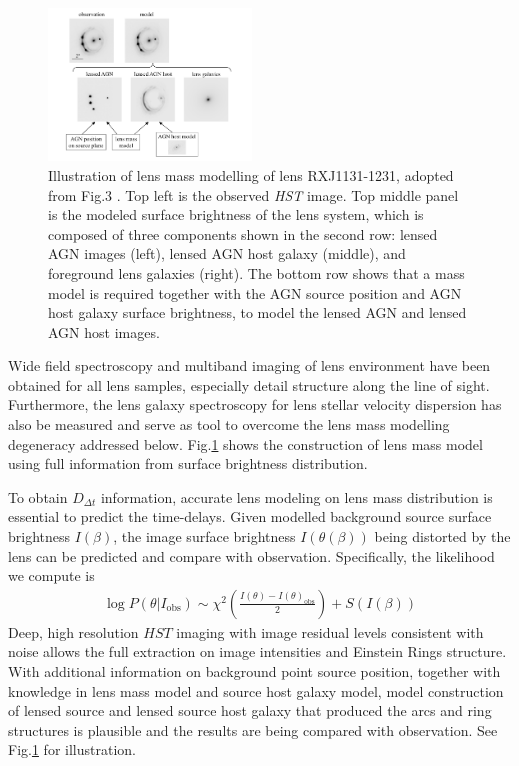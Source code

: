 \documentclass{cosmo}
\begin{document}
    \begin{figure}[h]
        \centering
        \includegraphics[width=0.48\textwidth]{fig3_2.png}
        \caption{Illustration of lens mass modelling of lens RXJ1131-1231, adopted from Fig.3  \cite{Suyu2018}. Top left is the observed \textit{HST} image. Top middle panel is the modeled surface brightness of the lens system, which is composed of three components shown in the second row: lensed AGN images (left), lensed AGN host galaxy (middle), and foreground lens galaxies (right). The bottom row shows that a mass model is required together with the AGN source position and AGN host galaxy surface brightness, to model the lensed AGN and lensed AGN host images.}
        \label{fig3}
    \end{figure}
    
    Wide field spectroscopy and multiband imaging of lens environment have been obtained for all lens samples, especially detail structure along the line of sight. Furthermore, the lens galaxy spectroscopy for lens stellar velocity dispersion has also be measured and serve as tool to overcome the lens mass modelling degeneracy addressed below. Fig.\ref{fig3} shows the construction of lens mass model using full information from surface brightness distribution.
    
    To obtain $D_{\Delta t}$ information, accurate lens modeling on lens mass distribution is essential to predict the time-delays. Given modelled background source surface brightness $I(\beta)$, the image surface brightness $I(\theta(\beta))$ being distorted by the lens can be predicted and compare with observation. Specifically, the likelihood we compute is 
    \begin{align*}
        \log P(\theta|I_\mathrm{obs}) \sim \chi^2 \left( \frac{I(\theta)-I(\theta)_{\mathrm{obs}}}{2}\right) + S(I(\beta)) 
    \end{align*}
    Deep, high resolution $\textit{HST}$ imaging with image residual levels consistent with noise allows the full extraction on image intensities and Einstein Rings structure. With additional information on background point source position, together with knowledge in lens mass model and source host galaxy model, model construction of lensed source and lensed source host galaxy that produced the arcs and ring structures is plausible and the results are being compared with observation. See Fig.\ref{fig3} for illustration.
    
\end{document}
